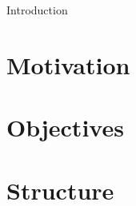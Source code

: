 Introduction

\section{Motivation}
\label{sec:motivation}




\section{Objectives}
\label{sec:objectives}


\section{Structure}

